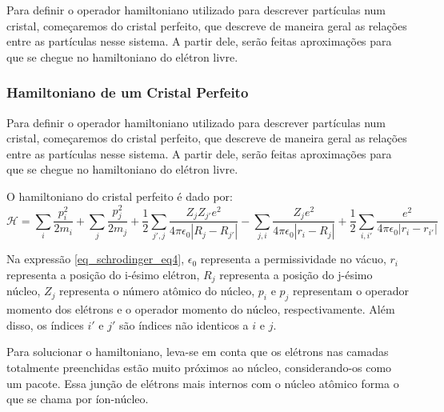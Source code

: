     \par Para definir o operador hamiltoniano utilizado para descrever partículas num cristal, começaremos do cristal perfeito, que descreve de maneira geral as relações entre as partículas nesse sistema. A partir dele, serão feitas aproximações para que se chegue no hamiltoniano do elétron livre\cite{qm_fis2}.

    \subsubsection{Hamiltoniano de um Cristal Perfeito}

      \par Para definir o operador hamiltoniano utilizado para descrever partículas num cristal, começaremos do cristal perfeito, que descreve de maneira geral as relações entre as partículas nesse sistema. A partir dele, serão feitas aproximações para que se chegue no hamiltoniano do elétron livre\cite{qm_fis2}. 
    
      \par O hamiltoniano do cristal perfeito\cite{frustrado3} é dado por:
      \begin{equation}\label{eq_schrodinger_eq4}
        \mathcal{H} = 
          \sum_{i} \frac{p_{i}^2}{2m_{i}} 
          + \sum_{j} \frac{p_{j}^2}{2m_{j}} 
          + \frac{1}{2} \sum_{j', j} \frac{Z_{j} Z_{j'} e^2}{4\pi\epsilon_{0}\left|R_{j} - R_{j'}\right|}-  \sum_{j, i} \frac{Z_{j} e^2}{4\pi\epsilon_{0}\left|r_{i} - R_{j}\right|} 
          + \frac{1}{2} \sum_{i, i'} \frac{e^2}{4\pi\epsilon_{0}\left|r_{i} - r_{i'}\right|}
      \end{equation}

      \par Na expressão \eqref{eq_schrodinger_eq4}, $\epsilon_{0}$ representa a permissividade no vácuo, $r_{i}$ representa a posição do i-ésimo elétron, $R_{j}$ representa a posição do j-ésimo núcleo, $Z_{j}$ representa o número atômico do núcleo, $p_{i}$ e $p_{j}$ representam o operador momento dos elétrons e o operador momento do núcleo, respectivamente. Além disso, os índices $i'$ e $j'$ são índices não identicos a $i$ e $j$.

      \par Para solucionar o hamiltoniano, leva-se em conta que os elétrons nas camadas totalmente preenchidas estão muito próximos ao núcleo, considerando-os como um pacote. Essa junção de elétrons mais internos com o núcleo atômico forma o que se chama por íon-núcleo.
    
